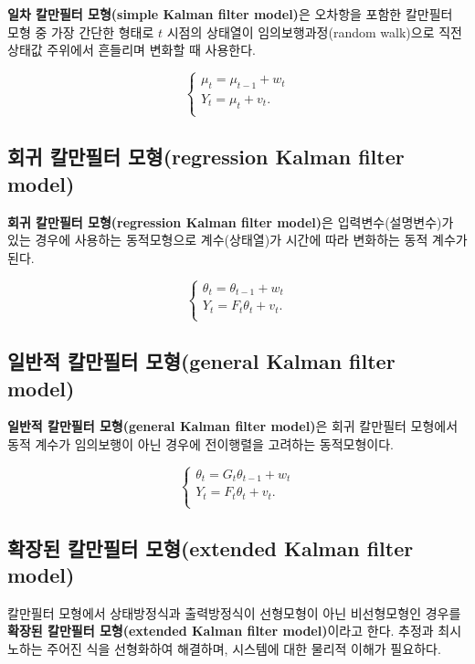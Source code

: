 \documentclass[b5paper,]{book}
\theoremstyle{definition}
\theoremstyle{definition}
\theoremstyle{definition}
\theoremstyle{remark}
\begin{document}
\textbf{일차 칼만필터 모형(simple Kalman filter model)}은 오차항을
포함한 칼만필터 모형 중 가장 간단한 형태로 \(t\) 시점의 상태열이
임의보행과정(random walk)으로 직전 상태값 주위에서 흔들리며 변화할 때
사용한다.

\[
\begin{cases}
\mu_{t}=\mu_{t-1}+w_{t} \\
Y_{t}=\mu_{t}+v_{t}.\\
\end{cases}
\]

\subsection{회귀 칼만필터 모형(regression Kalman filter
model)}\label{--regression-kalman-filter-model}

\textbf{회귀 칼만필터 모형(regression Kalman filter model)}은
입력변수(설명변수)가 있는 경우에 사용하는 동적모형으로 계수(상태열)가
시간에 따라 변화하는 동적 계수가 된다.

\[
\begin{cases}
\theta_{t}=\theta_{t-1}+w_{t} \\
Y_{t}=F_{t}\theta_{t}+v_{t}.\\
\end{cases}
\]

\subsection{일반적 칼만필터 모형(general Kalman filter
model)}\label{--general-kalman-filter-model}

\textbf{일반적 칼만필터 모형(general Kalman filter model)}은 회귀
칼만필터 모형에서 동적 계수가 임의보행이 아닌 경우에 전이행렬을 고려하는
동적모형이다.

\[
\begin{cases}
\theta_{t}=G_{t}\theta_{t-1}+w_{t} \\
Y_{t}=F_{t}\theta_{t}+v_{t}.\\
\end{cases}
\]

\subsection{확장된 칼만필터 모형(extended Kalman filter
model)}\label{--extended-kalman-filter-model}

칼만필터 모형에서 상태방정식과 출력방정식이 선형모형이 아닌 비선형모형인
경우를 \textbf{확장된 칼만필터 모형(extended Kalman filter model)}이라고
한다. 추정과 최시노하는 주어진 식을 선형화하여 해결하며, 시스템에 대한
물리적 이해가 필요하다.
\end{document}
